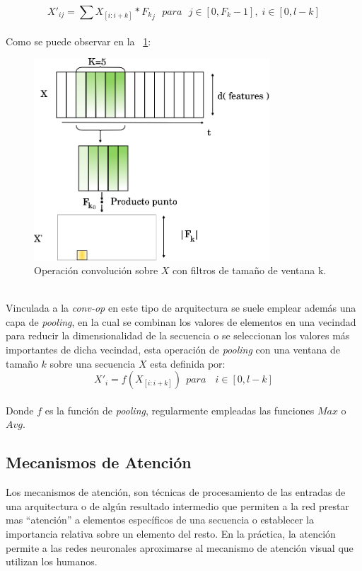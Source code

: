 	\begin{equation}
		X'_{ij} = \sum X_{[i:i+k]} * {F_k}_j ~~~ para ~~~ j \in [0, F_k-1], \;i \in [0, l-k]
	\end{equation}
	\\
	Como se puede observar en la \figurename~\ref{cnn}:
	\begin{figure}[!thb]
		\begin{center}
			\includegraphics[width=250pt]{images/cnn.eps}
		\end{center}
		\caption[Operación Convolución. CNN]{Operación convolución sobre $X$ con filtros de tamaño de ventana k. }
		\label{cnn}
	\end{figure}
	\\
	Vinculada a la \textit{conv-op} en este tipo de arquitectura se suele emplear además una capa de \textit{pooling}, en la cual se combinan los valores de elementos en una vecindad para reducir la dimensionalidad de la secuencia o se seleccionan los valores más importantes de dicha vecindad, esta operación de \textit{pooling} con una ventana de tamaño $k$  sobre una secuencia $X$ esta definida por:
	\begin{equation}
		X'_i = f(X_{[i:i+k]}) ~~ para ~~~  \;i \in [0, l-k]
	\end{equation}
	\\
	Donde $f$ es la función de \textit{pooling}, regularmente empleadas las funciones $Max$ o $Avg$.
		
\subsection{Mecanismos de Atención}\label{atencion}

	Los mecanismos de atención, son técnicas de procesamiento de las entradas de una arquitectura o de algún resultado intermedio que permiten a la red prestar mas ``atención'' a elementos específicos de una secuencia o establecer la importancia relativa sobre un elemento del resto. En la práctica, la atención permite a las redes neuronales aproximarse al mecanismo de atención visual que utilizan los humanos.


